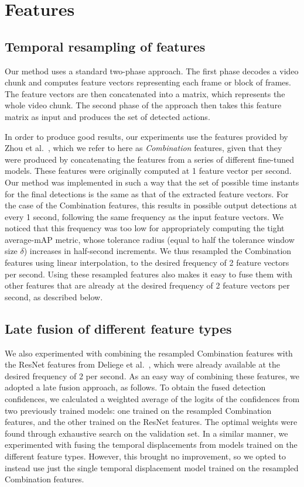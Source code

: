 \documentclass[10pt,twocolumn,letterpaper]{article}
\begin{document}
\section{Features}
\label{sec:features}

\subsection{Temporal resampling of features}
\label{sec:resample}

Our method uses a standard two-phase approach. The first phase decodes a video chunk and computes feature vectors representing each frame or block of frames. The feature vectors are then concatenated into a matrix, which represents the whole video chunk. The second phase of the approach then takes this feature matrix as input and produces the set of detected actions.

In order to produce good results, our experiments use the features provided by Zhou et al.~\cite{zhou2021feature}, which we refer to here as {\it Combination} features, given that they were produced by concatenating the features from a series of different fine-tuned models. These features were originally computed at 1 feature vector per second. Our method was implemented in such a way that the set of possible time instants for the final detections is the same as that of the extracted feature vectors. For the case of the Combination features, this results in possible output detections at every 1 second, following the same frequency as the input feature vectors. We noticed that this frequency was too low for appropriately computing the tight average-mAP metric, whose tolerance radius (equal to half the tolerance window size $\delta$) increases in half-second increments. 
We thus resampled the Combination features using linear interpolation, to the desired frequency of 2 feature vectors per second. Using these resampled features also makes it easy to fuse them with other features that are already at the desired frequency of 2 feature vectors per second, as described below.

\subsection{Late fusion of different feature types}



We also experimented with combining the resampled Combination features with the ResNet features from Deliege et al.~\cite{deliege2021soccernet}, which were already available at the desired frequency of 2 per second. As an easy way of combining these features, we adopted a late fusion approach, as follows. To obtain the fused detection confidences, we calculated a weighted average of the logits of the confidences from two previously trained models: one trained on the resampled Combination features, and the other trained on the ResNet features. The optimal weights were found through exhaustive search on the validation set. In a similar manner, we experimented with fusing the temporal displacements from models trained on the different feature types. However, this brought no improvement, so we opted to instead use just the single temporal displacement model trained on the resampled Combination features.
\end{document}
